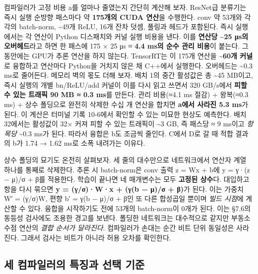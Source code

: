 컴파일러가 고정 비용 a를 얼마나 줄였는지 간단히 계산해 보자. ResNet급 분류기는 즉시 실행 순방향 패스마다 약 \textbf{175개의 CUDA 연산}을 수행한다. conv 약 53개와 각각의 batch-norm, \textasciitilde{}49개 ReLU, 16개 잔차 덧셈, 풀링과 헤드가 포함된다. 즉시 실행에서는 각 연산이 Python 디스패치와 커널 실행 비용을 낸다. 이를 \textbf{연산당 \textasciitilde{}25 μs의 오버헤드}라고 하면 한 패스에 175 × 25 μs ≈ \textbf{4.4 ms의 순수 관리 비용}이 붙는다. 그동안에는 GPU가 추론 연산을 하지 않는다. TensorRT는 이 175개 연산을 \textbf{\textasciitilde{}60개 커널}로 융합하고 연산마다 Python을 거치지 않은 채 C++에서 실행한다. 오버헤드는 \textasciitilde{}0.3 ms로 줄어든다. 메모리 벽의 몫도 더해 보자. 배치 1의 중간 활성값은 총 \textasciitilde{}45 MB이고, 즉시 실행의 개별 bn/ReLU/add 커널이 이를 다시 읽고 쓰면서 320 GB/s에서 \textbf{피할 수 있는 트래픽 90 MB ≈ 0.3 ms}를 만든다. 관리 비용(≈4.1 ms 절감) + 왕복(≈0.3 ms) + 상수 폴딩으로 완전히 삭제한 수십 개 연산을 합치면 \textbf{a에서 사라진 5.3 ms}가 된다. 이 계산은 터미널 기록 10-6에서 확인할 수 있는 미묘한 현상도 예측한다. 배치 32에서는 활성값이 32× 커져 피할 수 있는 트래픽이 \textasciitilde{}3 GB, 즉 패스당 ≈ 9 ms이고 \textit{항목당} \textasciitilde{}0.3 ms가 된다. 따라서 융합은 b도 조금씩 줄인다. C에서 D로 갈 때 적합 결과의 b가 1.74 → 1.62 ms로 소폭 내려가는 이유다.

상수 폴딩의 묘기도 온전히 살펴보자. 세 줄의 대수만으로 네트워크에서 연산자 계열 하나를 통째로 삭제한다. 추론 시 batch-norm은 conv 출력 z = Wx + b에 y = γ·(z − μ)/σ + β를 적용한다. 학습이 끝나면 네 매개변수는 모두 \textbf{고정된 상수}다. 대입하고 항을 다시 묶으면 \textbf{y = (γ/σ)·W·x + (γ(b − μ)/σ + β)}가 된다. 이는 가중치 W′ = (γ/σ)W, 편향 b′ = γ(b − μ)/σ + β인 또 다른 합성곱일 뿐이며 \textit{빌드 시점}에 계산할 수 있다. 융합을 시작하기도 전에 53개의 batch-norm이 0개가 된다. 이는 §7.6의 동등성 검사에도 조용한 경고를 보낸다. 폴딩한 네트워크는 대수적으로 같지만 부동소수점 연산의 \textit{결합 순서가 달라진다}. 컴파일러가 손대는 순간 비트 단위 동일성은 사라진다. 그래서 검사는 비트가 아니라 허용 오차를 확인한다.

\subsection*{세 컴파일러의 특징과 선택 기준}

